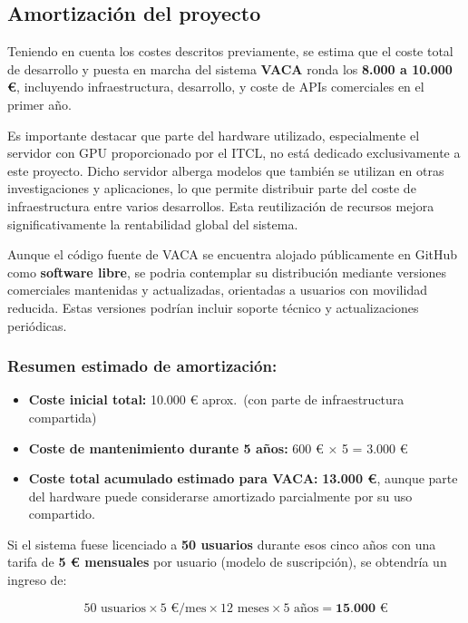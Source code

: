 \subsection{Amortización del proyecto}

Teniendo en cuenta los costes descritos previamente, se estima que el coste total de desarrollo y puesta en marcha del sistema \textbf{VACA} ronda los \textbf{8.000 a 10.000 €}, incluyendo infraestructura, desarrollo, y coste de APIs comerciales en el primer año.

Es importante destacar que parte del hardware utilizado, especialmente el servidor con GPU proporcionado por el ITCL, no está dedicado exclusivamente a este proyecto. Dicho servidor alberga modelos que también se utilizan en otras investigaciones y aplicaciones, lo que permite distribuir parte del coste de infraestructura entre varios desarrollos. Esta reutilización de recursos mejora significativamente la rentabilidad global del sistema.

Aunque el código fuente de VACA se encuentra alojado públicamente en GitHub como \textbf{software libre}, se podria contemplar su distribución mediante versiones comerciales mantenidas y actualizadas, orientadas a usuarios con movilidad reducida. Estas versiones podrían incluir soporte técnico y actualizaciones periódicas.


\subsubsection{Resumen estimado de amortización:}

\begin{itemize}
    \item \textbf{Coste inicial total:} 10.000 € aprox.\ (con parte de infraestructura compartida)
    \item \textbf{Coste de mantenimiento durante 5 años:} 600 € × 5 = 3.000 €
    \item \textbf{Coste total acumulado estimado para VACA:} \textbf{13.000 €}, aunque parte del hardware puede considerarse amortizado parcialmente por su uso compartido.
\end{itemize}

Si el sistema fuese licenciado a \textbf{50 usuarios} durante esos cinco años con una tarifa de \textbf{5 € mensuales} por usuario (modelo de suscripción), se obtendría un ingreso de:

\[
50 \text{ usuarios} \times 5 \text{ €/mes} \times 12 \text{ meses} \times 5 \text{ años} = \textbf{15.000 €}
\]

